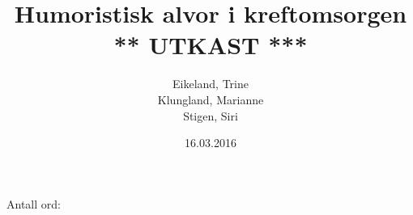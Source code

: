 \documentclass[a4paper,norsk,12pt,twoside]{report}
\begin{document}
  \author{Eikeland, Trine\\Klungland, Marianne\\Stigen, Siri}
  \date{16.03.2016}
  \title{Humoristisk alvor i kreftomsorgen \\
    {\Huge{\sffamily *** UTKAST ***}}}

  
  \maketitle
  \begin{abstract}
  
  \end{abstract}

  \tableofcontents

  Antall ord: 
  \clearpage

  \renewcommand{\arraystretch}{1.2}

  
  
  
  
  
  
  
  \clearpage

  \begingroup %
  \raggedright %
  \nocite{*} %
  
  \endgroup %

  \appendix
  
  \clearpage %
  \printindex
\end{document}
